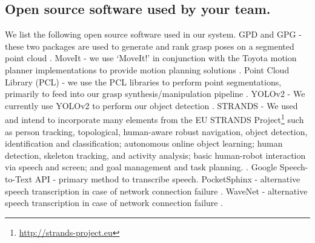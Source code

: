 \documentclass[runningheads,a4paper]{llncs}
\begin{document}
\subsection{Open source software used by your team.}
We list the following open source software used in our system. GPD and GPG - these two packages are used to generate and rank grasp poses on a segmented point cloud \cite{GPD1} \cite{GPD2}. MoveIt - we use `MoveIt!' in conjunction with the Toyota motion planner implementations to provide motion planning solutions \cite{MoveIt1} \cite{MoveIt2}. Point Cloud Library (PCL) - we use the PCL libraries to perform point segmentations, primarily to feed into our grasp synthesis/manipulation pipeline \cite{PCL}. YOLOv2 - We currently use YOLOv2 to perform our object detection \cite{yolo}. STRANDS - We used and intend to incorporate many elements from the EU STRANDS Project\footnote{\url{http://strands-project.eu}} such as person tracking, topological, human-aware robust navigation, object detection, identification and classification; autonomous online object learning; human detection, skeleton tracking, and activity analysis; basic human-robot interaction via speech and screen; and goal management and task planning. \cite{strands@ram} \cite{dondrup2015tracker} \cite{duckworth_aamas2016}. Google Speech-to-Text API - primary method to transcribe speech.  PocketSphinx - alternative speech transcription in case of network connection failure \cite{pocketsphinx}. WaveNet - alternative speech transcription in case of network connection failure \cite{wavenet}.
\end{document}

